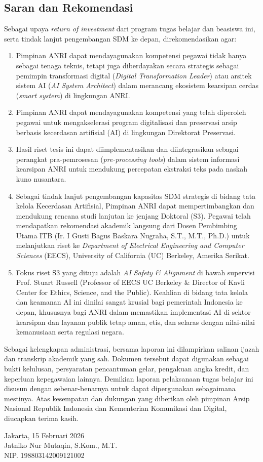 \documentclass[11pt, a4paper]{article}
\begin{document}
\subsection{Saran dan Rekomendasi}
Sebagai upaya \textit{return of investment} dari program tugas belajar dan beasiswa ini, serta tindak lanjut pengembangan SDM ke depan, direkomendasikan agar:
\begin{enumerate}
    \item Pimpinan ANRI dapat mendayagunakan kompetensi pegawai tidak hanya sebagai tenaga teknis, tetapi juga diberdayakan secara strategis sebagai pemimpin transformasi digital (\textit{Digital Transformation Leader}) atau arsitek sistem AI (\textit{AI System Architect}) dalam merancang ekosistem kearsipan cerdas (\textit{smart system}) di lingkungan ANRI.
    \item Pimpinan ANRI dapat mendayagunakan kompetensi yang telah diperoleh pegawai untuk mengakselerasi program digitalisasi dan preservasi arsip berbasis kecerdasan artifisial (AI) di lingkungan Direktorat Preservasi.
    \item Hasil riset tesis ini dapat diimplementasikan dan diintegrasikan sebagai perangkat pra-pemrosesan (\textit{pre-processing tools}) dalam sistem informasi kearsipan ANRI untuk mendukung percepatan ekstraksi teks pada naskah kuno nusantara.
    \item Sebagai tindak lanjut pengembangan kapasitas SDM strategis di bidang tata kelola Kecerdasan Artifisial, Pimpinan ANRI dapat mempertimbangkan dan mendukung rencana studi lanjutan ke jenjang Doktoral (S3). Pegawai telah mendapatkan rekomendasi akademik langsung dari Dosen Pembimbing Utama ITB (Ir. I Gusti Bagus Baskara Nugraha, S.T., M.T., Ph.D.) untuk melanjutkan riset ke \textit{Department of Electrical Engineering and Computer Sciences} (EECS), University of California (UC) Berkeley, Amerika Serikat.
    \item Fokus riset S3 yang dituju adalah \textit{AI Safety \& Alignment} di bawah supervisi Prof. Stuart Russell (Professor of EECS UC Berkeley \& Director of Kavli Center for Ethics, Science, and the Public). Keahlian di bidang tata kelola dan keamanan AI ini dinilai sangat krusial bagi pemerintah Indonesia ke depan, khususnya bagi ANRI dalam memastikan implementasi AI di sektor kearsipan dan layanan publik tetap aman, etis, dan selaras dengan nilai-nilai kemanusiaan serta regulasi negara.
\end{enumerate}

Sebagai kelengkapan administrasi, bersama laporan ini dilampirkan salinan ijazah dan transkrip akademik yang sah. Dokumen tersebut dapat digunakan sebagai bukti kelulusan, persyaratan pencantuman gelar, pengakuan angka kredit, dan keperluan kepegawaian lainnya. Demikian laporan pelaksanaan tugas belajar ini disusun dengan sebenar-benarnya untuk dapat dipergunakan sebagaimana mestinya. Atas kesempatan dan dukungan yang diberikan oleh pimpinan Arsip Nasional Republik Indonesia dan Kementerian Komunikasi dan Digital, diucapkan terima kasih.

\vspace{1.5cm}
\begin{flushright}
    Jakarta, 15 Februari 2026\\[2.5cm]
    Jatniko Nur Mutaqin, S.Kom., M.T.\\
    NIP. 198803142009121002
\end{flushright}
\end{document}
